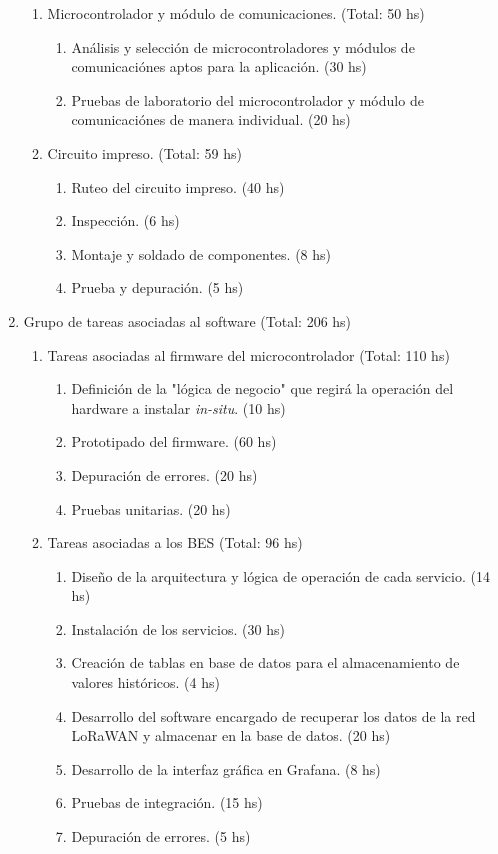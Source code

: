 \documentclass[11pt]{charter}
\begin{document}
\begin{enumerate}
\begin{enumerate}
		 \item Microcontrolador y módulo de comunicaciones. (Total: 50 hs)
			 \begin{enumerate}[label*=\arabic*.]
			 	\item Análisis y selección de microcontroladores y módulos de comunicaciónes aptos para la aplicación. (30 hs)
			 	\item Pruebas de laboratorio del microcontrolador y módulo de comunicaciónes de manera individual. (20 hs)
			 \end{enumerate}
		
		 \item Circuito impreso. (Total: 59 hs)
			 \begin{enumerate}[label*=\arabic*.]
			 	\item Ruteo del circuito impreso. (40 hs)
			 	\item Inspección. (6 hs)
			 	\item Montaje y soldado de componentes. (8 hs)
			 	\item Prueba y depuración. (5 hs)
			 \end{enumerate}			 			 			 
		\end{enumerate}

	\item Grupo de tareas asociadas al software (Total: 206 hs)
	\begin{enumerate}
		\item Tareas asociadas al firmware del microcontrolador (Total: 110 hs)
			\begin{enumerate}[label*=\arabic*.]
				\item Definición de la "lógica de negocio" que regirá la operación del hardware a instalar \textit{in-situ}. (10 hs)
				\item Prototipado del firmware. (60 hs)
				\item Depuración de errores. (20 hs)
				\item Pruebas unitarias. (20 hs)
			\end{enumerate}
		
		 \item Tareas asociadas a los BES (Total: 96 hs)
			\begin{enumerate}[label*=\arabic*.]
				\item Diseño de la arquitectura y lógica de operación de cada servicio. (14 hs)
				\item Instalación de los servicios. (30 hs)
				\item Creación de tablas en base de datos para el almacenamiento de valores históricos. (4 hs)
				\item Desarrollo del software encargado de recuperar los datos de la red LoRaWAN y almacenar en la base de datos. (20 hs)
				\item Desarrollo de la interfaz gráfica en Grafana. (8 hs)
				\item Pruebas de integración. (15 hs)
				\item Depuración de errores. (5 hs)
			\end{enumerate}
		\end{enumerate}
		

\end{enumerate}
\end{document}
